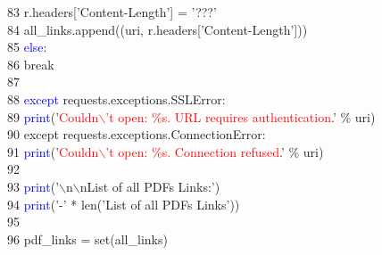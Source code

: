 83	 \hspace*{5mm}                                \hspace*{40mm}r.headers['Content-Length'] = '???'\\
84	 \hspace*{5mm}                                \hspace*{40mm}all\_links.append((uri, r.headers['Content-Length']))\\
85	 \hspace*{5mm}                        \hspace*{30mm}\textcolor{blue}{else}:\\
86	 \hspace*{5mm}                            \hspace*{35mm}break\\
87	 \hspace*{5mm}\\
88	 \hspace*{5mm}        \hspace*{10mm}\textcolor{blue}{except} requests.exceptions.SSLError:\\
89	 \hspace*{5mm}            \hspace*{15mm}\textcolor{blue}{print}('\textcolor{red}{Couldn$\backslash$'t open: \%s. URL requires authentication}.' \% uri)\\
90	 \hspace*{5mm}        \hspace*{10mm}except requests.exceptions.ConnectionError:\\
91	 \hspace*{5mm}            \hspace*{15mm}\textcolor{blue}{print}('\textcolor{red}{Couldn$\backslash$'t open: \%s. Connection refused}.' \% uri)\\
92	 \hspace*{5mm}\\
93	 \hspace*{5mm}    \hspace*{5mm}\textcolor{blue}{print}('$\backslash$n$\backslash$nList of all PDFs Links:')\\
94	 \hspace*{5mm}    \hspace*{5mm}\textcolor{blue}{print}('-' * len('List of all PDFs Links'))\\
95	 \hspace*{5mm}\\
96	 \hspace*{5mm}    \hspace*{5mm}pdf\_links = set(all\_links)\\
